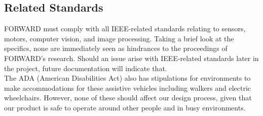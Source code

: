 \subsection{Related Standards}
\noindent FORWARD must comply with all IEEE-related standards relating to sensors, motors, computer vision, and image processing. Taking a brief look at the specifics, none are immediately seen as hindrances to the proceedings of FORWARD’s research. Should an issue arise with IEEE-related standards later in the project, future documentation will indicate that. \\

\noindent The ADA (American Disabilities Act) also has stipulations for environments to make accommodations for these assistive vehicles including walkers and electric wheelchairs. However, none of these should affect our design process, given that our product is safe to operate around other people and in busy environments.\\
